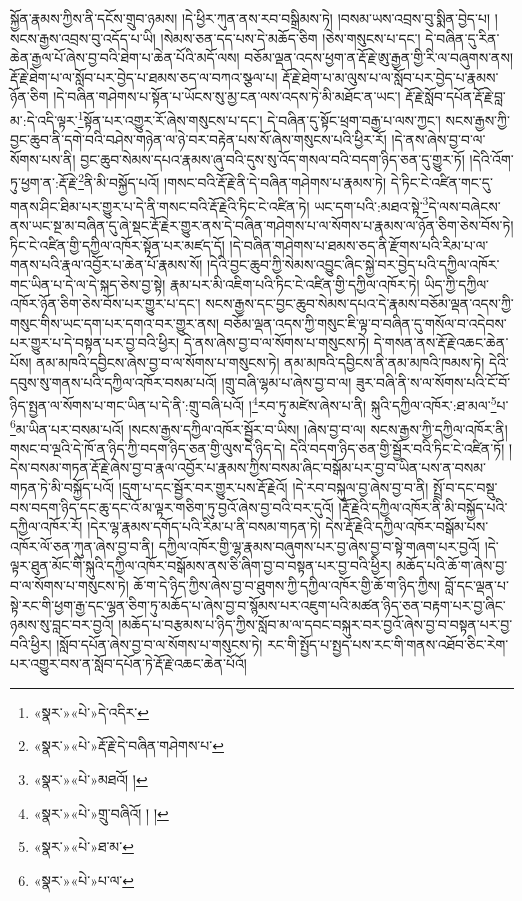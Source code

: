 སྐྱོན་རྣམས་ཀྱིས་ནི་དངོས་གྲུབ་ཉམས། །དེ་ཕྱིར་ཀུན་ནས་རབ་བསྒྲིམས་ཏེ། །བསམ་ཡས་འབྲས་བུ་སྨིན་བྱེད་པ། །སངས་རྒྱས་འབྲས་བུ་འདོད་པ་ཡི། །སེམས་ཅན་དད་པས་དེ་མཆོད་ཅིག །ཅེས་གསུངས་པ་དང་། དེ་བཞིན་དུ་རིན་ཆེན་རྒྱལ་པོ་ཞེས་བྱ་བའི་ཐེག་པ་ཆེན་པོའི་མདོ་ལས། བཅོམ་ལྡན་འདས་ཕྱག་ན་རྡོ་རྗེ་ཨུ་རྒྱན་གྱི་རི་ལ་བཞུགས་ནས། རྡོ་རྗེ་ཐེག་པ་ལ་སློབ་པར་བྱེད་པ་ཐམས་ཅད་ལ་བཀའ་སྩལ་པ། རྡོ་རྗེ་ཐེག་པ་མ་ལུས་པ་ལ་སློབ་པར་བྱེད་པ་རྣམས་ཉོན་ཅིག །དེ་བཞིན་གཤེགས་པ་སྟོན་པ་ཡོངས་སུ་མྱ་ངན་ལས་འདས་ཏེ་མི་མཐོང་ན་ཡང་། རྡོ་རྗེ་སློབ་དཔོན་རྡོ་རྗེ་བླ་མ་:དེ་འདི་ལྟར་\footnote{«སྣར་»«པེ་»དེ་འདིར་}སྟོན་པར་འགྱུར་རོ་ཞེས་གསུངས་པ་དང་། དེ་བཞིན་དུ་སྟོང་ཕྲག་བརྒྱ་པ་ལས་ཀྱང་། སངས་རྒྱས་ཀྱི་བྱང་ཆུབ་ནི་དགེ་བའི་བཤེས་གཉེན་ལ་ཉེ་བར་བརྟེན་པས་སོ་ཞེས་གསུངས་པའི་ཕྱིར་རོ། །དེ་ནས་ཞེས་བྱ་བ་ལ་སོགས་པས་ནི། བྱང་ཆུབ་སེམས་དཔའ་རྣམས་ཞུ་བའི་དུས་སུ་འོད་གསལ་བའི་བདག་ཉིད་ཅན་དུ་གྱུར་ཏོ། །དེའི་འོག་ཏུ་ཕྱག་ན་:རྡོ་རྗེ་\footnote{«སྣར་»«པེ་»རྡོ་རྗེ་དེ་བཞིན་གཤེགས་པ་}ནི་མི་བསྐྱོད་པའོ། །གསང་བའི་རྡོ་རྗེ་ནི་དེ་བཞིན་གཤེགས་པ་རྣམས་ཏེ། དེ་ཏིང་ངེ་འཛིན་གང་དུ་གནས་ཤིང་ཐིམ་པར་གྱུར་པ་དེ་ནི་གསང་བའི་རྡོ་རྗེའི་ཏིང་ངེ་འཛིན་ཏེ། ཡང་དག་པའི་:མཐའ་སྟེ་\footnote{«སྣར་»«པེ་»མཐའོ། །}དེ་ལས་བཞེངས་ནས་ཡང་སྔ་མ་བཞིན་དུ་ཞེ་སྡང་རྡོ་རྗེར་གྱུར་ནས་དེ་བཞིན་གཤེགས་པ་ལ་སོགས་པ་རྣམས་ལ་ཉོན་ཅིག་ཅེས་བོས་ཏེ། ཏིང་ངེ་འཛིན་གྱི་དཀྱིལ་འཁོར་སྟོན་པར་མཛད་དོ། །དེ་བཞིན་གཤེགས་པ་ཐམས་ཅད་ནི་རྫོགས་པའི་རིམ་པ་ལ་གནས་པའི་རྣལ་འབྱོར་པ་ཆེན་པོ་རྣམས་སོ། །དེའི་བྱང་ཆུབ་ཀྱི་སེམས་འབྱུང་ཞིང་སྐྱེ་བར་བྱེད་པའི་དཀྱིལ་འཁོར་གང་ཡིན་པ་དེ་ལ་དེ་སྐད་ཅེས་བྱ་སྟེ། རྣམ་པར་མི་འཇིག་པའི་ཏིང་ངེ་འཛིན་གྱི་དཀྱིལ་འཁོར་ཏེ། ཡིད་ཀྱི་དཀྱིལ་འཁོར་ཉོན་ཅིག་ཅེས་བོས་པར་གྱུར་པ་དང་། སངས་རྒྱས་དང་བྱང་ཆུབ་སེམས་དཔའ་དེ་རྣམས་བཅོམ་ལྡན་འདས་ཀྱི་གསུང་གིས་ཡང་དག་པར་དགའ་བར་གྱུར་ནས། བཅོམ་ལྡན་འདས་ཀྱི་གསུང་ཇི་ལྟ་བ་བཞིན་དུ་གསོལ་བ་འདེབས་པར་གྱུར་པ་དེ་བསྟན་པར་བྱ་བའི་ཕྱིར། དེ་ནས་ཞེས་བྱ་བ་ལ་སོགས་པ་གསུངས་ཏེ། དེ་གསན་ནས་རྡོ་རྗེ་འཆང་ཆེན་པོས། ནམ་མཁའི་དབྱིངས་ཞེས་བྱ་བ་ལ་སོགས་པ་གསུངས་ཏེ། ནམ་མཁའི་དབྱིངས་ནི་ནམ་མཁའི་ཁམས་ཏེ། དེའི་དབུས་སུ་གནས་པའི་དཀྱིལ་འཁོར་བསམ་པའོ། །གྲུ་བཞི་ལྷམ་པ་ཞེས་བྱ་བ་ལ། ཟུར་བཞི་ནི་ས་ལ་སོགས་པའི་ངོ་བོ་ཉིད་སྤྱན་ལ་སོགས་པ་གང་ཡིན་པ་དེ་ནི་:གྲུ་བཞི་པའོ། །\footnote{«སྣར་»«པེ་»གྲུ་བཞིའོ། ། །}རབ་ཏུ་མཛེས་ཞེས་པ་ནི། སྐུའི་དཀྱིལ་འཁོར་:ཐ་མལ་\footnote{«སྣར་»«པེ་»ཐ་མ་}པ་\footnote{«སྣར་»«པེ་»པ་ལ་}མ་ཡིན་པར་བསམ་པའོ། །སངས་རྒྱས་དཀྱིལ་འཁོར་སྦྱོར་བ་ཡིས། །ཞེས་བྱ་བ་ལ། སངས་རྒྱས་ཀྱི་དཀྱིལ་འཁོར་ནི། གསང་བ་ལྔའི་དེ་ཁོ་ན་ཉིད་ཀྱི་བདག་ཉིད་ཅན་གྱི་ལུས་དེ་ཉིད་དེ། དེའི་བདག་ཉིད་ཅན་གྱི་སྦྱོར་བའི་ཏིང་ངེ་འཛིན་ཏོ། །དེས་བསམ་གཏན་རྡོ་རྗེ་ཞེས་བྱ་བ་རྣལ་འབྱོར་པ་རྣམས་ཀྱིས་བསམ་ཞིང་བསྒོམ་པར་བྱ་བ་ཡིན་པས་ན་བསམ་གཏན་ཏེ་མི་བསྐྱོད་པའོ། །དྲུག་པ་དང་སྦྱོར་བར་གྱུར་པས་རྡོ་རྗེའོ། །དེ་རབ་བསྐུལ་བྱ་ཞེས་བྱ་བ་ནི། སྤྲོ་བ་དང་བསྡུ་བས་བདག་ཉིད་དང་ཆུ་དང་འོ་མ་ལྟར་གཅིག་ཏུ་བྱའོ་ཞེས་བྱ་བའི་བར་དུའོ། །རྡོ་རྗེའི་དཀྱིལ་འཁོར་ནི་མི་བསྐྱོད་པའི་དཀྱིལ་འཁོར་རོ། །དེར་ལྷ་རྣམས་དགོད་པའི་རིམ་པ་ནི་བསམ་གཏན་ཏེ། དེས་རྡོ་རྗེའི་དཀྱིལ་འཁོར་བསྒོམ་པས་འཁོར་ལོ་ཅན་ཀུན་ཞེས་བྱ་བ་ནི། དཀྱིལ་འཁོར་གྱི་ལྷ་རྣམས་བཞུགས་པར་བྱ་ཞེས་བྱ་བ་སྟེ་གཞག་པར་བྱའོ། །དེ་ལྟར་ཐུན་མོང་གི་སྐུའི་དཀྱིལ་འཁོར་བསྒོམས་ནས་ཅི་ཞིག་བྱ་བ་བསྟན་པར་བྱ་བའི་ཕྱིར། མཆོད་པའི་ཆོ་ག་ཞེས་བྱ་བ་ལ་སོགས་པ་གསུངས་ཏེ། ཆོ་ག་དེ་ཉིད་ཀྱིས་ཞེས་བྱ་བ་ཐུགས་ཀྱི་དཀྱིལ་འཁོར་གྱི་ཆོ་ག་ཉིད་ཀྱིས། བློ་དང་ལྡན་པ་སྟེ་རང་གི་ཕྱག་རྒྱ་དང་ལྷན་ཅིག་ཏུ་མཆོད་པ་ཞེས་བྱ་བ་སྙོམས་པར་འཇུག་པའི་མཚན་ཉིད་ཅན་བརྟག་པར་བྱ་ཞིང་ཉམས་སུ་བླང་བར་བྱའོ། །མཆོད་པ་བརྩམས་པ་ཉིད་ཀྱིས་སློབ་མ་ལ་དབང་བསྐུར་བར་བྱའོ་ཞེས་བྱ་བ་བསྟན་པར་བྱ་བའི་ཕྱིར། །སློབ་དཔོན་ཞེས་བྱ་བ་ལ་སོགས་པ་གསུངས་ཏེ། རང་གི་སྤྱོད་པ་སྤྱད་པས་རང་གི་གནས་འཐོབ་ཅིང་རེག་པར་འགྱུར་བས་ན་སློབ་དཔོན་ཏེ་རྡོ་རྗེ་འཆང་ཆེན་པོའོ། 